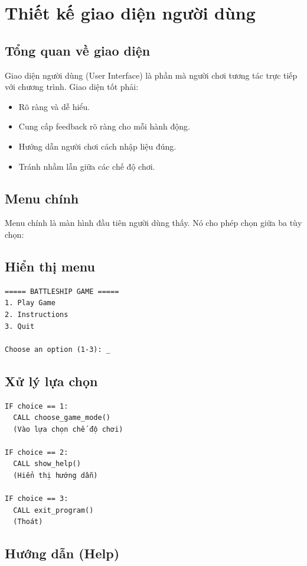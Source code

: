 
\section{Thiết kế giao diện người dùng}

\subsection{Tổng quan về giao diện}

Giao diện người dùng (User Interface) là phần mà người chơi tương tác trực tiếp với chương trình. Giao diện tốt phải:
\begin{itemize}
    \item Rõ ràng và dễ hiểu.
    \item Cung cấp feedback rõ ràng cho mỗi hành động.
    \item Hướng dẫn người chơi cách nhập liệu đúng.
    \item Tránh nhầm lẫn giữa các chế độ chơi.
\end{itemize}

\subsection{Menu chính}

Menu chính là màn hình đầu tiên người dùng thấy. Nó cho phép chọn giữa ba tùy chọn:

\subsection{Hiển thị menu}

\begin{verbatim}
===== BATTLESHIP GAME =====
1. Play Game
2. Instructions
3. Quit

Choose an option (1-3): _
\end{verbatim}

\subsection{Xử lý lựa chọn}

\begin{verbatim}
IF choice == 1:
  CALL choose_game_mode()
  (Vào lựa chọn chế độ chơi)

IF choice == 2:
  CALL show_help()
  (Hiển thị hướng dẫn)

IF choice == 3:
  CALL exit_program()
  (Thoát)
\end{verbatim}

\subsection{Hướng dẫn (Help)}

